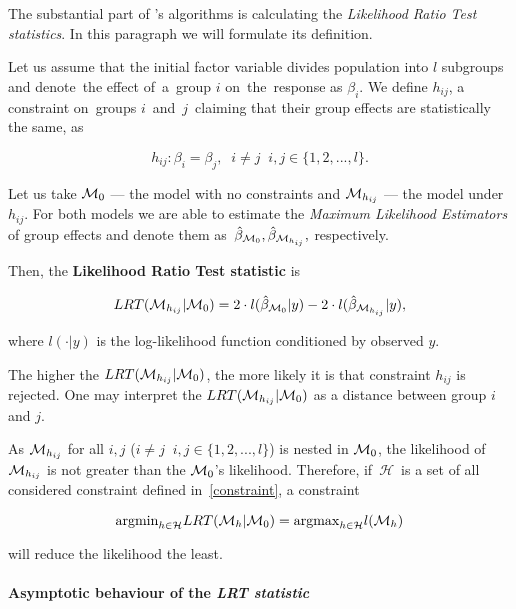 The substantial part of \factorMergerTitle 's algorithms is calculating the \emph{Likelihood Ratio Test statistics}. In this paragraph we will formulate its definition.

Let us assume that the initial factor variable divides population into $l$ subgroups and denote~the effect of~a~group $i$ on~the~response as $\beta_i$. We define $h_{ij}$, a constraint on~groups $i$~and~$j$~claiming that their group effects are statistically the same, as

\begin{equation} \label{constraint}
h_{ij}: \beta_i = \beta_j, \;\; i \neq j \;\; i,j \in \{1, 2, ..., l \}.
\end{equation}


Let us take $\mathcal{M}_0$  --- the model with no constraints and $\mathcal{M}_{h_{ij}}$ --- the model under $h_{ij}$. For both models we are able to estimate the \emph{Maximum Likelihood Estimators} of group effects and denote them as~$\hat{\beta}_{\mathcal{M}_0}, \hat{\beta}_{\mathcal{M}_{h_{ij}}},$ respectively.

Then, the \textbf{Likelihood Ratio Test statistic} is

\begin{equation} \label{LRTstat}
LRT(\mathcal{M}_{h_{ij}}|\mathcal{M}_0) = 2 \cdot l (\hat{\beta}_{\mathcal{M}_0}|y) - 2 \cdot l (\hat{\beta}_{\mathcal{M}_{h_{ij}}}|y), 
\end{equation}

where $l(\cdot|y)$ is the log-likelihood function conditioned by observed $y$.

The higher the $LRT(\mathcal{M}_{h_{ij}}|\mathcal{M}_0)$, the more likely it is that constraint $h_{ij}$ is rejected. One may interpret the $LRT(\mathcal{M}_{h_{ij}}|\mathcal{M}_0)$ as a distance between group $i$ and $j$.

As $\mathcal{M}_{h_{ij}}$ for all $i,j$  ($i \neq j \;\; i,j \in \{1, 2, ..., l \}$) is nested in $\mathcal{M}_0$, the likelihood of $\mathcal{M}_{h_{ij}}$ is not greater than the $\mathcal{M}_0$'s likelihood. Therefore, if~$\mathcal{H}$~is a set of all considered constraint defined in~\eqref{constraint}, a constraint 

\begin{equation} \label{maxLikelihood}
\mathrm{argmin}_{h \in \mathcal{H}} LRT(\mathcal{M}_h|\mathcal{M}_0) = \mathrm{argmax}_{h \in \mathcal{H}} l(\mathcal{M}_h)
\end{equation}

will reduce the likelihood the least.

\paragraph{Asymptotic behaviour of the \emph{LRT statistic}}

